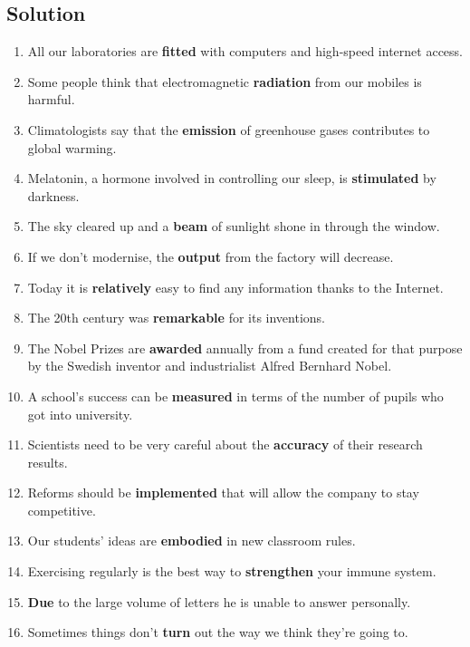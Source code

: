 \subsection*{Solution}
\begin{enumerate}
      \item All our laboratories are \textbf{fitted} with computers and high-speed
            internet access.
      \item Some people think that electromagnetic \textbf{radiation} from our
            mobiles is harmful.
      \item Climatologists say that the \textbf{emission} of greenhouse gases
            contributes to global warming.
      \item Melatonin, a hormone involved in controlling our sleep, is
            \textbf{stimulated} by darkness.
      \item The sky cleared up and a \textbf{beam} of sunlight shone in through
            the window.
      \item If we don’t modernise, the \textbf{output} from the factory will
            decrease.
      \item Today it is \textbf{relatively} easy to find any information thanks
            to the Internet.
      \item The 20th century was \textbf{remarkable} for its inventions.
      \item The Nobel Prizes are \textbf{awarded} annually from a fund created
            for that purpose by the Swedish inventor and industrialist Alfred Bernhard
            Nobel.
      \item A school’s success can be \textbf{measured} in terms of the number
            of pupils who got into university.
      \item Scientists need to be very careful about the \textbf{accuracy} of
            their research results.
      \item Reforms should be \textbf{implemented} that will allow the company
            to stay competitive.
      \item Our students’ ideas are \textbf{embodied} in new classroom rules.
      \item Exercising regularly is the best way to \textbf{strengthen} your
            immune system.
      \item \textbf{Due} to the large volume of letters he is unable to answer
            personally.
      \item Sometimes things don't \textbf{turn} out the way we think they're
            going to.
\end{enumerate}

